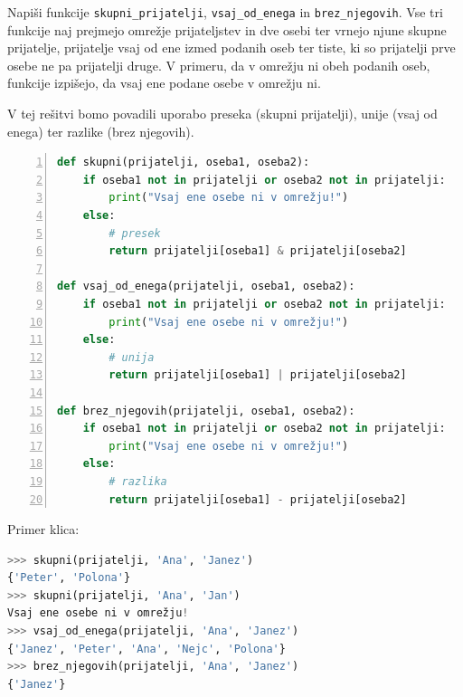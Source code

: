 \begin{zgled}
Napiši funkcije \texttt{skupni\_prijatelji}, \texttt{vsaj\_od\_enega} in \texttt{brez\_njegovih}. Vse tri funkcije naj prejmejo omrežje prijateljstev in dve osebi ter vrnejo njune skupne prijatelje, prijatelje vsaj od ene izmed podanih oseb ter tiste, ki so prijatelji prve osebe ne pa prijatelji druge. V primeru, da v omrežju ni obeh podanih oseb, funkcije izpišejo, da vsaj ene podane osebe v omrežju ni.
\end{zgled}
\begin{resitev}
V tej rešitvi bomo povadili uporabo preseka (skupni prijatelji), unije (vsaj od enega) ter razlike (brez njegovih). 
\begin{lstlisting}[language=Python,numbers=left]
def skupni(prijatelji, oseba1, oseba2):
    if oseba1 not in prijatelji or oseba2 not in prijatelji:
        print("Vsaj ene osebe ni v omrežju!")
    else:
        # presek
        return prijatelji[oseba1] & prijatelji[oseba2]

def vsaj_od_enega(prijatelji, oseba1, oseba2):
    if oseba1 not in prijatelji or oseba2 not in prijatelji:
        print("Vsaj ene osebe ni v omrežju!")
    else:
        # unija
        return prijatelji[oseba1] | prijatelji[oseba2]

def brez_njegovih(prijatelji, oseba1, oseba2):
    if oseba1 not in prijatelji or oseba2 not in prijatelji:
        print("Vsaj ene osebe ni v omrežju!")
    else:
        # razlika
        return prijatelji[oseba1] - prijatelji[oseba2]
\end{lstlisting}
Primer klica:
\begin{lstlisting}[language=Python]
>>> skupni(prijatelji, 'Ana', 'Janez')
{'Peter', 'Polona'}
>>> skupni(prijatelji, 'Ana', 'Jan')
Vsaj ene osebe ni v omrežju!
>>> vsaj_od_enega(prijatelji, 'Ana', 'Janez')
{'Janez', 'Peter', 'Ana', 'Nejc', 'Polona'}
>>> brez_njegovih(prijatelji, 'Ana', 'Janez')
{'Janez'}
\end{lstlisting}
\end{resitev}


